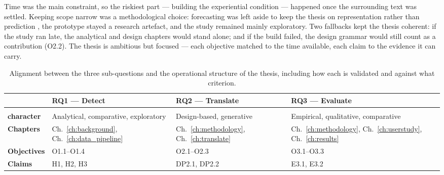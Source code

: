 Time was the main constraint, so the riskiest part --- building the experiential condition --- happened once the surrounding text was settled. Keeping scope narrow was a methodological choice: forecasting was left aside to keep the thesis on representation rather than prediction \citep{sonnewald2021}, the prototype stayed a research artefact, and the study remained mainly exploratory. Two fallbacks kept the thesis coherent: if the study ran late, the analytical and design chapters would stand alone; and if the build failed, the design grammar would still count as a contribution (O2.2). The thesis is ambitious but focused --- each objective matched to the time available, each claim to the evidence it can carry.

\begin{table}[!ht]
    \centering
    \small
    \setlength{\tabcolsep}{5pt}
    \renewcommand{\arraystretch}{1.25}
    \caption{Alignment between the three sub-questions and the operational structure of the thesis, including how each is validated and against what criterion.}
    \label{tab:alignment}
    \begin{tabular}{
        @{}
        >{\RaggedRight\arraybackslash}p{2.7cm}
        >{\RaggedRight\arraybackslash}p{3.7cm}
        >{\RaggedRight\arraybackslash}p{3.7cm}
        >{\RaggedRight\arraybackslash}p{3.7cm}
        @{}
    }
        \toprule
        & \textbf{RQ1 --- Detect}
        & \textbf{RQ2 --- Translate}
        & \textbf{RQ3 --- Evaluate} \\
        \midrule
        \makecell[l]{\textbf{Epistemic}\\\textbf{character}}
            & Analytical, comparative, exploratory
            & Design-based, generative
            & Empirical, qualitative, comparative \\[0.5em]

        \textbf{Chapters}
            & Ch.~\ref{ch:background}, Ch.~\ref{ch:data_pipeline}
            & Ch.~\ref{ch:methodology}, Ch.~\ref{ch:translate}
            & Ch.~\ref{ch:methodology}, Ch.~\ref{ch:userstudy}, Ch.~\ref{ch:results} \\[0.5em]

        \textbf{Objectives}
            & O1.1--O1.4
            & O2.1--O2.3
            & O3.1--O3.3 \\[0.5em]

        \textbf{Claims}
            & H1, H2, H3
            & DP2.1, DP2.2
            & E3.1, E3.2 \\[0.5em]


\end{tabular}
\end{table}
